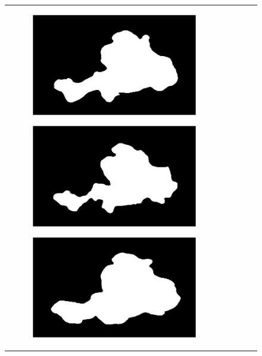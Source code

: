 \documentclass[a4paper, 10pt, conference]{ieeeconf}        %
\begin{document}
\begin{figure}[ht!]
\begin{tabular}{c c c c c}
\begin{subfigure}{0.2\textwidth}
         \end{subfigure}
         \begin{subfigure}{0.2\textwidth}
         \includegraphics[scale=0.2]{expert_1GroundTrue_05.JPG}
         \end{subfigure}
         \begin{subfigure}{0.2\textwidth}
          \includegraphics[scale=0.2]{expert_2GroundTrue_05.JPG}
          \end{subfigure} 
         \begin{subfigure}{0.2\textwidth}
          \includegraphics[scale=0.2]{expert_3GroundTrue_05.JPG}

\end{subfigure}
\end{tabular}
\end{figure}
\end{document}
